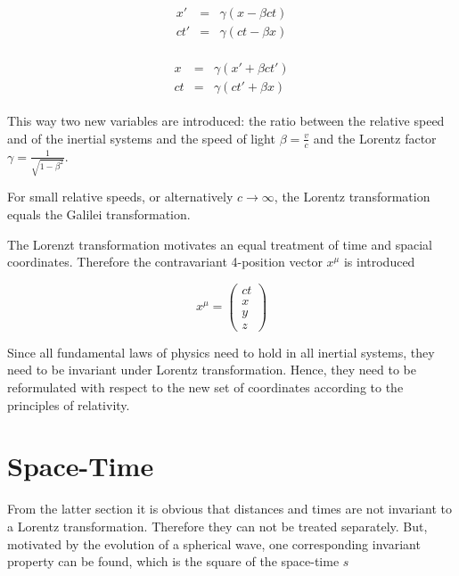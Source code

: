 \begin{eqnarray}\begin{array}{rcl}\label{lorentz1}
 x'  &=& \gamma\left(x-\beta ct\right)\\
 ct' &=& \gamma\left(ct-\beta x\right)
\end{array}\end{eqnarray}

\begin{eqnarray}\begin{array}{rcl}\label{lorentz2}
 x   &=& \gamma\left(x'+\beta ct'\right)\\
 ct  &=& \gamma\left(ct'+\beta x\right)
\end{array}\end{eqnarray}

This way two new variables are introduced: the ratio between the relative speed
and of the inertial systems and the speed of light $\beta = \frac vc$ and the
Lorentz factor $\gamma = \frac 1{\sqrt{1-\beta^2}}$.

For small relative speeds, or alternatively $c\rightarrow\infty$, the Lorentz
transformation equals the Galilei transformation.

The Lorenzt transformation motivates an equal treatment of time and spacial
coordinates. Therefore the contravariant 4-position vector $x^\mu$ is introduced

\begin{equation}
 x^\mu = \begin{pmatrix}
          ct \\ x \\ y \\ z
         \end{pmatrix}
\end{equation}

Since all fundamental laws of physics need to hold in all inertial systems,
they need to be invariant under Lorentz transformation. Hence, they need to be
reformulated with respect to the new set of coordinates according to
the principles of relativity. \cite{einstein88}


\section{Space-Time}
From the latter section it is obvious that distances and times are not
invariant to a Lorentz transformation. Therefore they can not be treated
separately. But, motivated by the evolution of a spherical wave, one corresponding
invariant property can be found, which is the square of the space-time $s$


